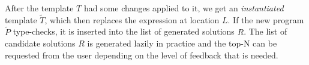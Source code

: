 After the template $T$ had some changes applied to it, we get an
\emph{instantiated} template $\tilde{T}$, which then replaces the expression at
location $L$. If the new program $\tilde{P}$ type-checks, it is inserted into
the list of generated solutions $R$. The list of candidate solutions $R$ is
generated lazily in practice and the top-N can be requested from the user
depending on the level of feedback that is needed.



